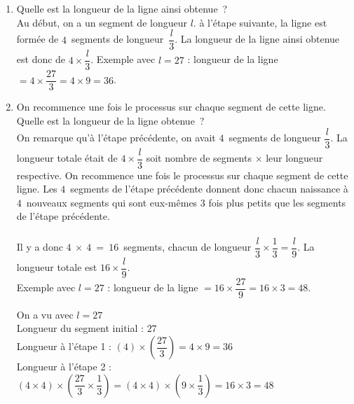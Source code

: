 \begin{enumerate}
	\item Quelle est la longueur de la ligne ainsi obtenue~?\\[1em]
		Au début, on a un segment de longueur $l$. à l'étape suivante, la ligne est formée de $4$~segments de longueur~$\dfrac{l}{3}$. La longueur de la ligne ainsi obtenue est donc de $4 \times \dfrac{l}{3}$. Exemple avec $l = 27$ : longueur de la ligne $= 4 \times \dfrac{27}{3} = 4 \times 9 = 36$.
	\item On recommence une fois le processus sur chaque segment de cette ligne.\\ Quelle est la longueur de la ligne obtenue~?\\[1em]
		On remarque qu'à l'étape précédente, on avait $4$~segments de longueur $\dfrac{l}{3}$. La longueur totale était de $4 \times \dfrac{l}{3}$ soit \og nombre de segments\fg{} $\times$ \og leur longueur respective\fg{}. On recommence une fois le processus sur chaque segment de cette ligne. Les $4$~segments de l'étape précédente donnent donc chacun naissance à $4$~nouveaux segments qui sont eux-m\^{e}mes $3$ fois plus petits que les segments de l'étape précédente.\\
	\\
	Il y a donc $4~\times~4~=~16$~segments, chacun de longueur $\dfrac{l}{3} \times \dfrac{1}{3} = \dfrac{l}{9}$. La longueur totale est $16 \times \dfrac{l}{9}$.\\
	Exemple avec $l = 27$ : longueur de la ligne $= 16 \times \dfrac{27}{9} = 16 \times 3 = 48$.

	\hrulefill
	
	On a vu avec $l = 27$\\
	Longueur du segment initial : $27$\\
	Longueur à l'étape 1 : $\left( 4 \right) \times \left( \dfrac{27}{3} \right) = 4 \times 9 = 36$\\
	Longueur à l'étape 2 : $\left( 4 \times 4 \right) \times \left( \dfrac{27}{3} \times \dfrac{1}{3} \right)
		= \left( 4 \times 4 \right) \times \left( 9 \times \dfrac{1}{3} \right)
		= 16 \times 3
		= 48$
		
	\hrulefill	



\end{enumerate}
